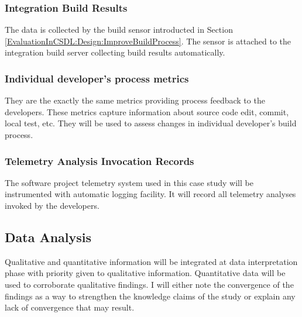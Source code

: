 \subsubsection{Integration Build Results}
 
The data is collected by the build sensor introducted in Section \ref{EvaluationInCSDL:Design:ImproveBuildProcess}. The sensor is attached to the integration build server collecting build results automatically.
	      

\subsubsection{Individual developer's process metrics}

They are the exactly the same metrics providing process feedback to the developers. These metrics capture information about source code edit, commit, local test, etc. They will be used to assess changes in individual developer's build process.

	      
\subsubsection{Telemetry Analysis Invocation Records} 
	   
The software project telemetry system used in this case study will be instrumented with automatic logging facility. It will record all telemetry analyses invoked by the developers.



\subsection{Data Analysis}


Qualitative and quantitative information will be integrated at data interpretation phase with priority given to qualitative information. Quantitative data will be used to corroborate qualitative findings. I will either note the convergence of the findings as a way to strengthen the knowledge claims of the study or explain any lack of convergence that may result.













